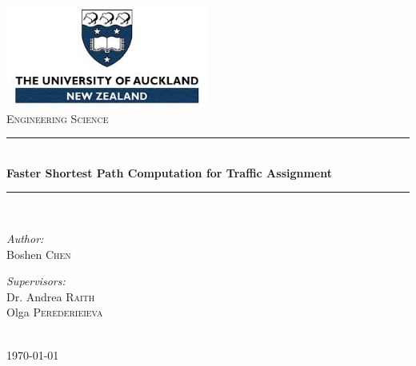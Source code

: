 \begin{titlepage}
    \newcommand{\HRule}{\rule{\linewidth}{0.5mm}}
    \centering
    \includegraphics[width=0.5\textwidth]{img/logo.jpg}\\[2cm]    
    \textsc{\Large Engineering Science}\\[2cm]
    \HRule \\[0.4cm]
    { \huge \bfseries Faster Shortest Path Computation for Traffic Assignment
    }\\[0.4cm]
    \HRule \\[2cm]

    \begin{minipage}{0.4\textwidth}
        \begin{flushleft} \large
            \emph{Author:}\\
            Boshen \textsc{Chen}
        \end{flushleft}
    \end{minipage}
    \begin{minipage}{0.4\textwidth}
        \begin{flushright} \large
            \emph{Supervisors:} \\
            Dr. Andrea \textsc{Raith} \\
            Olga \textsc{Perederieieva}
        \end{flushright}
    \end{minipage}\\[4cm]

    \vfill
    {\large \today}
    \thispagestyle{empty}
\end{titlepage} 
